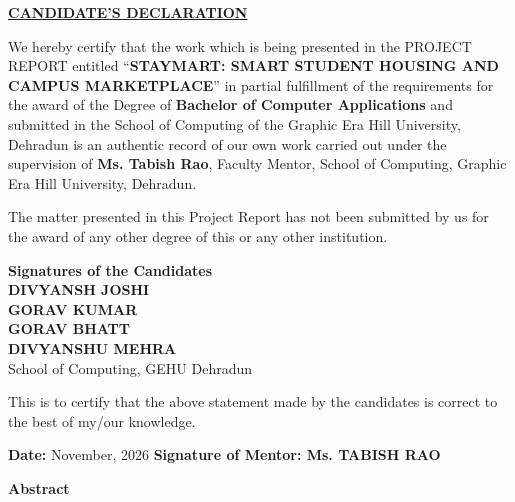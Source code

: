 \documentclass[12pt,a4paper]{report}
\begin{document}
\newpage
{}
\setcounter{page}{1}

\begin{center}
    {\fontsize{14pt}{16pt}\selectfont \textbf{\underline{CANDIDATE'S DECLARATION}}\par}
\end{center}

\vspace{0.8cm}
\noindent We hereby certify that the work which is being presented in the PROJECT REPORT entitled ``\textbf{STAYMART: SMART STUDENT HOUSING AND CAMPUS MARKETPLACE}'' in partial fulfillment of the requirements for the award of the Degree of \textbf{Bachelor of Computer Applications} and submitted in the School of Computing of the Graphic Era Hill University, Dehradun is an authentic record of our own work carried out under the supervision of \textbf{Ms. Tabish Rao}, Faculty Mentor, School of Computing, Graphic Era Hill University, Dehradun.

\vspace{0.6cm}
\noindent The matter presented in this Project Report has not been submitted by us for the award of any other degree of this or any other institution.

\vspace{1.2cm}
\begin{flushright}
    \textbf{Signatures of the Candidates} \\[0.3cm]
    \textbf{DIVYANSH JOSHI} \\
    \textbf{GORAV KUMAR} \\
    \textbf{GORAV BHATT} \\
    \textbf{DIVYANSHU MEHRA} \\
    School of Computing, GEHU Dehradun
\end{flushright}

\vspace{1.0cm}
\noindent This is to certify that the above statement made by the candidates is correct to the best of my/our knowledge.

\vspace{1.5cm}
\noindent \textbf{Date:} November, 2026 \hfill \textbf{Signature of Mentor: Ms. TABISH RAO}

\newpage
{}
\begin{center}
    {\fontsize{14pt}{16pt}\selectfont \textbf{Abstract}\par}
\end{center}
\vspace{0.5cm}
\end{document}
